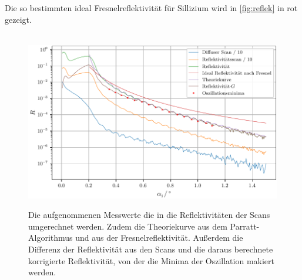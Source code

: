 Die so bestimmten ideal Fresnelreflektivität für Sillizium wird in \autoref{fig:reflek} in rot gezeigt.
\\\\
\begin{figure}
    \centering
    \caption{Die aufgenommenen Messwerte die in die Reflektivitäten der Scans umgerechnet werden. Zudem die Theoriekurve aus dem Parratt-Algorithmus und aus der Fresnelreflektivität.
    Außerdem die Differenz der Reflektivität aus den Scans und die daraus berechnete korrigierte Reflektivität, von der die Minima der Oszillation makiert werden.}
    \includegraphics[width=\textwidth]{content/data/reflek.pdf}
    \label{fig:reflek}
\end{figure}
\FloatBarrier